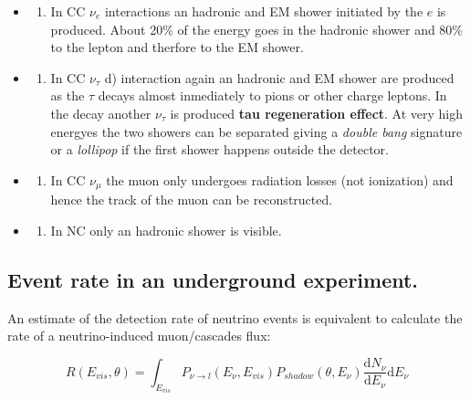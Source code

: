 \documentclass[
  letterpaper,
  DIV=11,
  numbers=noendperiod]{scrreprt}
\providecommand{\tightlist}{%
  \setlength{\itemsep}{0pt}\setlength{\parskip}{0pt}}\usepackage{longtable,booktabs,array}
\begin{document}
\begin{itemize}
\tightlist
\item
  \begin{enumerate}
  \def\labelenumi{\alph{enumi})}
  \setcounter{enumi}{1}
  \tightlist
  \item
    In CC \(\nu_e\) interactions an hadronic and EM shower initiated by
    the \(e\) is produced. About 20\% of the energy goes in the hadronic
    shower and 80\% to the lepton and therfore to the EM shower.
  \end{enumerate}
\item
  \begin{enumerate}
  \def\labelenumi{\alph{enumi})}
  \setcounter{enumi}{3}
  \tightlist
  \item
    In CC \(\nu_\tau\) d) interaction again an hadronic and EM shower
    are produced as the \(\tau\) decays almost inmediately to pions or
    other charge leptons. In the decay another \(\nu_\tau\) is produced
    \textbf{tau regeneration effect}. At very high energyes the two
    showers can be separated giving a \emph{double bang} signature or a
    \emph{lollipop} if the first shower happens outside the detector.
  \end{enumerate}
\item
  \begin{enumerate}
  \def\labelenumi{\alph{enumi})}
  \setcounter{enumi}{2}
  \tightlist
  \item
    In CC \(\nu_\mu\) the muon only undergoes radiation losses (not
    ionization) and hence the track of the muon can be reconstructed.
  \end{enumerate}
\item
  \begin{enumerate}
  \def\labelenumi{\alph{enumi})}
  \tightlist
  \item
    In NC only an hadronic shower is visible.
  \end{enumerate}
\end{itemize}

\subsection{Event rate in an underground
experiment.}\label{event-rate-in-an-underground-experiment.}

An estimate of the detection rate of neutrino events is equivalent to
calculate the rate of a neutrino-induced muon/cascades flux:

\[R(E_{vis}, \theta) = \int_{E_{vis}} P_{\nu\rightarrow l} (E_\nu, E_{vis}) P_{shadow}(\theta, E_\nu) \frac{\mathrm{ d}N_\nu}{\mathrm{ d}E_\nu}\mathrm{ d}E_\nu\]
\end{document}
